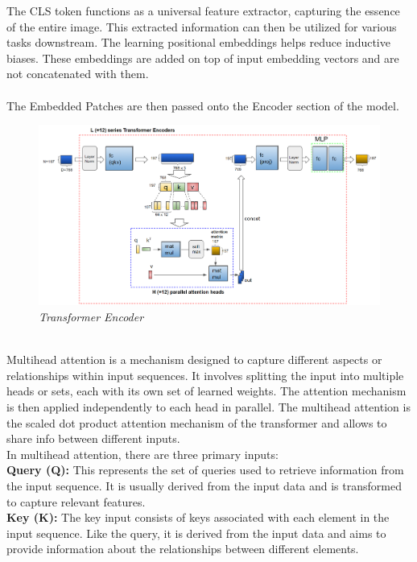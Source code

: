 The CLS token functions as a universal feature extractor, capturing the essence of the entire image. This extracted information can then be utilized for various tasks downstream. The learning positional embeddings helps reduce inductive biases. These embeddings are added on top of input embedding vectors and are not concatenated with them.\\
\\
The Embedded Patches are then passed onto the Encoder section of the model.\\
\begin{figure}[htbp]
    \centering
    \includegraphics[width=6.3in]{img/transformer_encoder.png}
    \caption{\textit{Transformer Encoder}}
\end{figure}\\

Multihead attention is a mechanism designed to capture different aspects or relationships within input sequences. It involves splitting the input into multiple heads or sets, each with its own set of learned weights. The attention mechanism is then applied independently to each head in parallel.
The multihead attention is the scaled dot product attention mechanism of the transformer and allows to share info between different inputs.\\

In multihead attention, there are three primary inputs:\\

\textbf{Query (Q):} This represents the set of queries used to retrieve information from the input sequence. It is usually derived from the input data and is transformed to capture relevant features.\\

\textbf{Key (K):} The key input consists of keys associated with each element in the input sequence. Like the query, it is derived from the input data and aims to provide information about the relationships between different elements.\\

